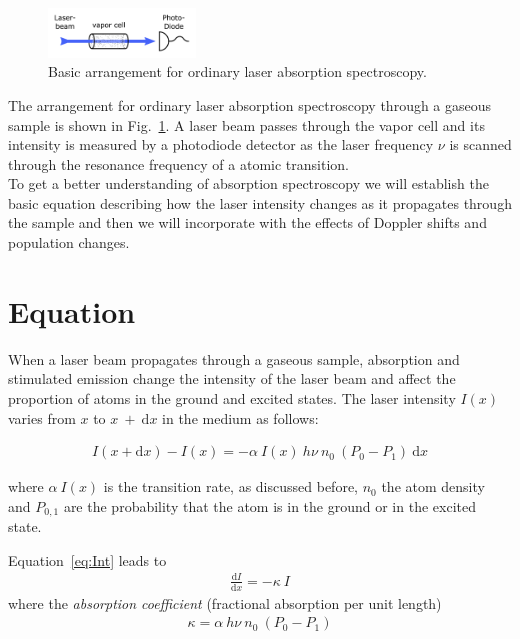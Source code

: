 \begin{figure}
    \centering
    \includegraphics[width=0.35\textwidth]{absorption_spectroscopy_theory}    
    \caption{\label{fig:absorption_spectroscopy} Basic arrangement for ordinary 
        laser absorption spectroscopy.}
\end{figure}

The arrangement for ordinary laser absorption spectroscopy through a gaseous sample 
is shown in Fig.~\ref{fig:absorption_spectroscopy}. A laser beam passes through 
the vapor cell and its intensity is measured by a photodiode detector as the laser 
frequency \(\nu \) is scanned through the resonance frequency of a atomic transition. \\
To get a better understanding of absorption 
spectroscopy we will establish the basic equation describing how the laser intensity 
changes as it propagates through the sample and then we will incorporate with the 
effects of Doppler shifts and population changes. 
\pagebreak

\section{Equation} %

When a laser beam propagates through a gaseous sample, absorption and stimulated
emission change the intensity of the laser beam and affect the proportion of atoms 
in the ground and excited states. The laser intensity \(I(x) \) varies from \(x \) 
to \(x~+~\mathrm{d}x \) in the medium as follows:

\begin{align} \label{eq:Int}
    I(x+\mathrm{d}x)-I(x) = - \alpha~I(x) ~ h\nu ~ n_0 ~ (P_0-P_1)~\mathrm{d}x 
\end{align}

where \(\alpha~I(x) \) is the transition rate, as discussed before, \(n_0\) the 
atom density and \(P_{0,1} \) are the probability that the atom is in the ground
or in the excited state. 

Equation~\ref{eq:Int} leads to
\begin{align}
    \frac{ \mathrm{d}I }{ \mathrm{d}x } = -\kappa ~ I
\end{align}
where the \textit{absorption coefficient} (fractional absorption per unit length)
\begin{align}\label{eq:kappa}
    \kappa = \alpha ~ h\nu  ~ n_0 ~ (P_0-P_1)
\end{align}

